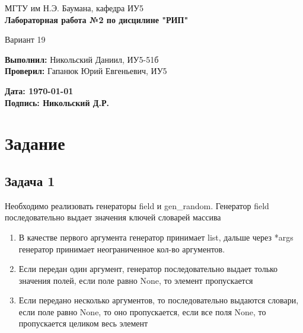 \documentclass{article}
\begin{document}
\begin{titlepage}
    \begin{center}
        \normalsize
        МГТУ им Н.Э. Баумана, кафедра ИУ5 \\
        \vspace*{1cm}
        \LARGE
        \textbf{Лабораторная работа №2 по дисцилине "РИП"}

        \vspace{0.5cm}
        Вариант 19
    \end{center}
    \vfill

    \begin{flushright}
        \textbf{Выполнил:} Никольский Даниил, ИУ5-51б \\
        \textbf{Проверил: } Гапанюк Юрий Евгеньевич, ИУ5 \\
    \end{flushright}
    \vspace{1.5cm}
    \begin{flushleft}
        \textbf{Дата: \today} \\
        \textbf{Подпись: Никольский Д.Р.} \\
    \end{flushleft}
\end{titlepage}

\tableofcontents
\newpage

\section{Задание}
\subsection{Задача 1}
Необходимо реализовать генераторы field и gen\_random. Генератор field последовательно выдает значения ключей словарей массива

\begin{enumerate}
    \item В качестве первого аргумента генератор принимает list, дальше через *args генератор принимает неограниченное кол-во аргументов.

    \item Если передан один аргумент, генератор последовательно выдает только значения полей, если поле равно None, то элемент пропускается

    \item Если передано несколько аргументов, то последовательно выдаются словари, если поле равно None, то оно пропускается, если все поля None, то пропускается целиком весь элемент

\end{enumerate}
\end{document}
